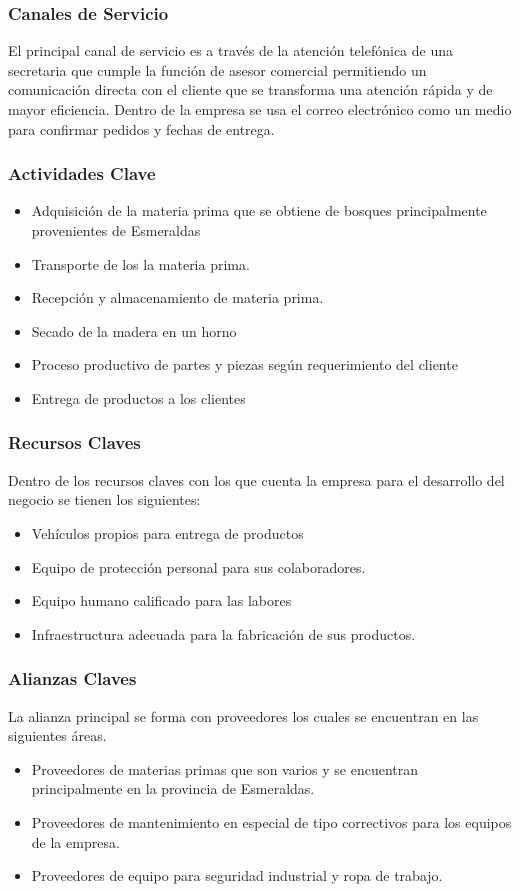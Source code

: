 \documentclass[12pt, a4paper]{article}
\begin{document}
\begin{itemize}
\subsubsection{Canales de Servicio}

El principal canal de servicio es a través de la atención  telefónica de una secretaria que cumple la función de asesor comercial permitiendo un comunicación directa con el cliente que se transforma una atención rápida y de mayor eficiencia. Dentro de la empresa se usa el correo electrónico como un medio para confirmar pedidos y fechas de entrega.

\subsubsection{Actividades Clave}
\begin{itemize}
	\item  Adquisición de la materia prima que se obtiene de bosques principalmente provenientes de Esmeraldas
	\item  Transporte de los la materia prima.
	\item  Recepción y almacenamiento de materia prima.
	\item  Secado de la madera en un horno
	\item  Proceso productivo de partes y piezas según requerimiento del cliente
	\item  Entrega de  productos a los  clientes
\end{itemize}
\subsubsection{Recursos Claves}
Dentro de los recursos claves con los que cuenta la empresa para el desarrollo del negocio se tienen los siguientes:
\begin{itemize}
	\item Vehículos propios para entrega de productos
	\item Equipo de protección personal para sus colaboradores.
	\item Equipo humano calificado para las labores
	\item Infraestructura adecuada para la fabricación de sus productos.
\end{itemize}
\subsubsection{Alianzas Claves}
La alianza principal se forma con proveedores los cuales se encuentran en las siguientes áreas.
\begin {itemize}
	\item Proveedores de materias primas que son varios y se encuentran principalmente en la provincia de Esmeraldas.
	\item Proveedores de mantenimiento en especial de tipo correctivos para los equipos de la empresa.
	\item Proveedores de equipo para seguridad industrial y ropa de trabajo.
\end{itemize}

\end{itemize}
\end{document}

